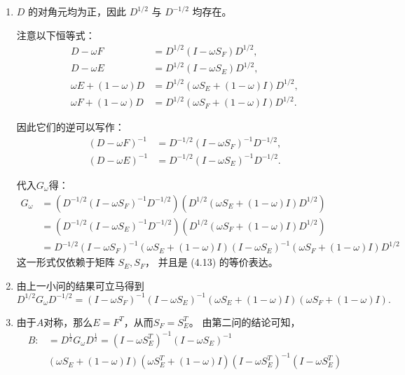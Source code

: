 \documentclass{ctexart}
\begin{document}
\begin{solution}
\begin{enumerate}
  \item  \( D \) 的对角元均为正，因此 \( D^{1/2} \) 与 \( D^{-1/2} \) 均存在。

注意以下恒等式：
\[
\begin{aligned}
D - \omega F &= D^{1/2} (I - \omega S_F) D^{1/2}, \\
D - \omega E &= D^{1/2} (I - \omega S_E) D^{1/2}, \\
\omega E + (1 - \omega) D &= D^{1/2} (\omega S_E + (1 - \omega) I) D^{1/2}, \\
\omega F + (1 - \omega) D &= D^{1/2} (\omega S_F + (1 - \omega) I) D^{1/2}.
\end{aligned}
\]

因此它们的逆可以写作：
\[
\begin{aligned}
(D - \omega F)^{-1} &= D^{-1/2} (I - \omega S_F)^{-1} D^{-1/2}, \\
(D - \omega E)^{-1} &= D^{-1/2} (I - \omega S_E)^{-1} D^{-1/2}.
\end{aligned}
\]

代入\(G_{\omega } \)得：
\[
\begin{aligned}
G_{\omega}&= 
  (D^{-1/2} (I - \omega S_F)^{-1} D^{-1/2})(D^{1/2} (\omega S_E + (1 - \omega) I) D^{1/2})\\
  &=(D^{-1/2} (I - \omega S_E)^{-1} D^{-1/2})(D^{1/2} (\omega S_F + (1 - \omega) I) D^{1/2})\\
  &=D^{-1/2}(I - \omega S_F)^{-1}(\omega S_E + (1 - \omega) I)(I - \omega S_E)^{-1}(\omega S_F + (1 - \omega) I)D^{1/2}
\end{aligned}
\]
这一形式仅依赖于矩阵 \( S_E, S_F \)，
并且是 (4.13) 的等价表达。
\item  由上一小问的结果可立马得到 \[
    D^{1/2} G_{\omega} D^{-1/2}
    = (I - \omega S_F)^{-1} (I - \omega S_E)^{-1}
      (\omega S_E + (1 - \omega) I)
      (\omega S_F + (1 - \omega) I).
  \]
\item 由于\(A \)对称，那么\(E=F^T \)，从而\(S_F=S_E^T \)。
  由第二问的结论可知，\[
\begin{aligned}
  B:&=D^{\frac{1}{2}}G_{\omega}D^{\frac{1}{2}}= (I - \omega S_E^T)^{-1} (I - \omega S_E)^{-1}\\
      &(\omega S_E + (1 - \omega) I)(\omega S_E^T + (1 - \omega) I)(I-\omega S_E^T)^{-1}(I-\omega S_E^T)\\ 

\end{aligned}
    \]
\end{enumerate}
  
\end{solution}
 
\end{document}
